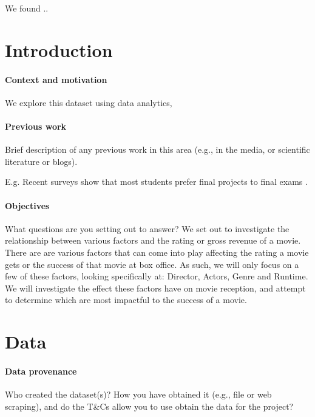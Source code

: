 \documentclass[11pt,a4paper]{article}
\begin{document}
        We found ..

    \section{Introduction}

        \paragraph{Context and motivation}

            We explore this dataset using data analytics,  

        \paragraph{Previous work}

            Brief description of any previous work in this area (e.g., in the media, or
                scientific literature or blogs).

            E.g. Recent surveys show that most students prefer final projects to final
                exams \cite{Space2021}.

        \paragraph{Objectives}

            What questions are you setting out to answer?
            We set out to investigate the relationship between various factors and the rating
                or gross revenue of a movie. 
            There are are various factors that can come into play affecting the rating a movie
                gets or the success of that movie at box office.
            As such, we will only focus on a few of these factors, looking specifically at: 
                Director, Actors, Genre and Runtime.
            We will investigate the effect these factors have on movie reception, and attempt to
                determine which are most impactful to the success of a movie.
            

    \section{Data}

        \paragraph{Data provenance}
            Who created the dataset(s)?
            How you have obtained it (e.g., file or web scraping), and do the T\&Cs allow
                you to use obtain the data for the project?
\end{document}
